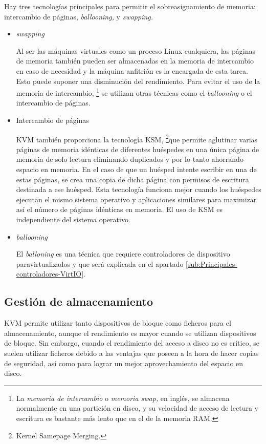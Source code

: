 \documentclass[spanisheDIVcalc,twoside,parskip-,pointlessnumbers,final]{scrbook}
\begin{document}
Hay tres tecnologías principales para permitir el sobreasignamiento
de memoria: intercambio de páginas, \emph{ballooning,} y \emph{swapping.}
\begin{itemize}
\item \emph{swapping}


Al ser las máquinas virtuales como un proceso Linux cualquiera, las
páginas de memoria también pueden ser almacenadas en la memoria de
intercambio en caso de necesidad y la máquina anfitrión es la encargada
de esta tarea. Esto puede suponer una disminución del rendimiento.
Para evitar el uso de la memoria de intercambio,%
\footnote{La \emph{memoria de intercambio }o \emph{memoria swap, }en inglés,
se almacena normalmente en una partición en disco, y su velocidad
de acceso de lectura y escritura es bastante más lento que en el de
la memoria RAM.%
} se utilizan otras técnicas como el \emph{ballooning} o el intercambio
de páginas.

\item Intercambio de páginas


KVM también proporciona la tecnología KSM,%
\footnote{Kernel Samepage Merging.%
}que permite aglutinar varias páginas de memoria idénticas de diferentes
huéspedes en una única página de memoria de solo lectura eliminando
duplicados y por lo tanto ahorrando espacio en memoria. En el caso
de que un huésped intente escribir en una de estas páginas, se crea
una copia de dicha página con permisos de escritura destinada a ese
huésped. Esta tecnología funciona mejor cuando los huéspedes ejecutan
el mismo sistema operativo y aplicaciones similares para maximizar
así el número de páginas idénticas en memoria. El uso de KSM es independiente
del sistema operativo. 

\item \emph{ballooning}


El \emph{balloning }es una técnica que requiere controladores de dispositivo
paravirtualizados y que será explicada en el apartado \ref{sub:Principales-controladores-VirtIO}.

\end{itemize}

\subsection{Gestión de almacenamiento}

KVM permite utilizar tanto dispositivos de bloque como ficheros para
el almacenamiento, aunque el rendimiento es mayor cuando se utilizan
dispositivos de bloque. Sin embargo, cuando el rendimiento del acceso
a disco no es crítico, se suelen utilizar ficheros debido a las ventajas
que poseen a la hora de hacer copias de seguridad, así como para lograr
un mejor aprovechamiento del espacio en disco.
\end{document}
